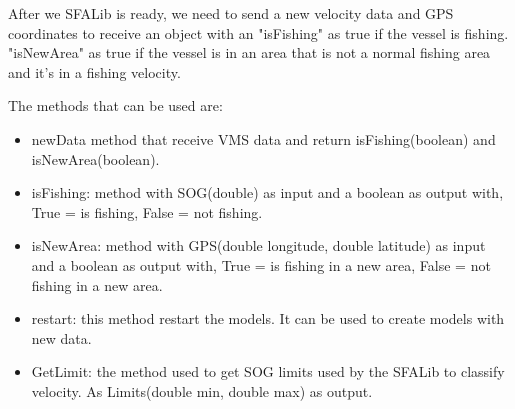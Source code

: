 After we SFALib is ready, we need to send a new velocity data and GPS coordinates to receive an object with an "isFishing" as true if the vessel is fishing. "isNewArea" as true if the vessel is in an area that is not a normal fishing area and it's in a fishing velocity.

The methods that can be used are:
\begin{itemize}
\item newData method that receive VMS data and return isFishing(boolean) and isNewArea(boolean).
\item isFishing: method with SOG(double) as input and a boolean as output with, True = is fishing, False = not fishing.
\item isNewArea: method with GPS(double longitude, double latitude) as input and a boolean as output with, True = is fishing in a new area, False = not fishing in a new area.
\item restart: this method restart the models. It can be used to create models with new data.
\item GetLimit: the method used to get SOG limits used by the SFALib to classify velocity. As Limits(double min, double max) as output.
\end{itemize}






